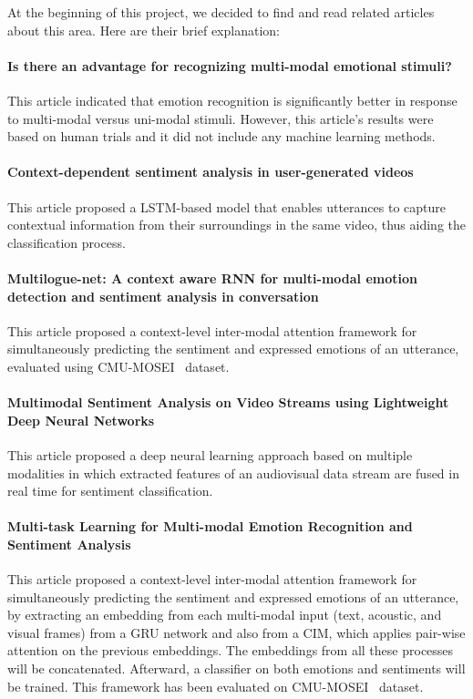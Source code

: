 At the beginning of this project, we decided to find and read related articles about this area. Here are their brief explanation:

\paragraph{Is there an advantage for recognizing multi-modal emotional stimuli?~\cite{paulmann2011there}} This article indicated that emotion recognition is significantly better in response to multi-modal versus uni-modal stimuli. However, this article's results were based on human trials and it did not include any machine learning methods.

\paragraph{Context-dependent sentiment analysis in user-generated videos~\cite{poria2017context}} This article proposed a LSTM-based model that enables utterances to capture contextual information from their surroundings in the same video, thus aiding the classification process.

\paragraph{Multilogue-net: A context aware RNN for multi-modal emotion detection and sentiment analysis in conversation~\cite{shenoy2020multilogue}} This article proposed a context-level inter-modal attention framework for simultaneously predicting the sentiment and expressed emotions of an utterance, evaluated using CMU-MOSEI~\cite{zadeh2018multimodal} dataset.

\paragraph{Multimodal Sentiment Analysis on Video Streams using Lightweight Deep Neural Networks~\cite{yakaew2021multimodal}} This article proposed a deep neural learning approach based on multiple modalities in which extracted features of an audiovisual data stream are fused in real time for sentiment classification.

\paragraph{Multi-task Learning for Multi-modal Emotion Recognition and Sentiment Analysis~\cite{akhtar2019multi}} This article proposed a context-level inter-modal attention framework for simultaneously predicting the sentiment and expressed emotions of an utterance, by extracting an embedding from each multi-modal input (text, acoustic, and visual frames) from a GRU network and also from a CIM, which applies pair-wise attention on the previous embeddings. The embeddings from all these processes will be concatenated. Afterward, a classifier on both emotions and sentiments will be trained. This framework has been evaluated on CMU-MOSEI~\cite{zadeh2018multimodal} dataset.

